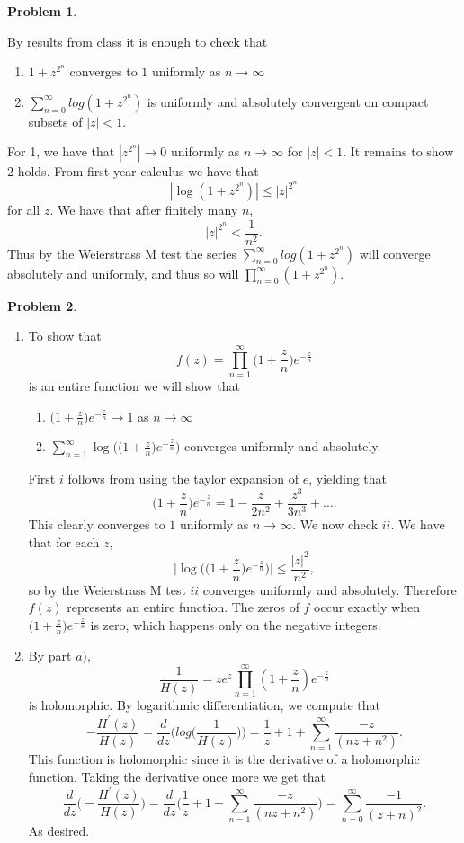 \documentclass[12pt, a4paper]{article}
\newtheorem{problem}{Problem}
\theoremstyle{definition}
\begin{document}
	\newpage
	\begin{problem}
	\end{problem}
 By results from class it is enough to check that \begin{enumerate}[label = \arabic*:]
 	\item $1+z^{2^n}$ converges to $1$ uniformly as $n\to \infty$ 
 	\item  $\sum_{n=0}^\infty log(1+z^{2^n})$ is uniformly and absolutely convergent on compact subsets of $|z|<1$.  
 	 \end{enumerate}
  For 1, we have that $|z^{2^n}| \to 0$ uniformly as $n\to \infty$ for $|z|<1$. It remains to show $2$ holds. From first year calculus we have that $$|\log(1+z^{2^n})| \leq |z|^{2^n}$$ for all $z$. We have that after finitely many $n$, $$|z|^{2^n} < \frac{1}{n^2}.$$
  Thus by the Weierstrass M test the series $\sum_{n=0}^\infty log(1+z^{2^n})$ will converge absolutely and uniformly, and thus so will $\prod_{n=0}^\infty (1+z^{2^n})$. 
  \newpage
  \begin{problem}
  \end{problem}
\begin{enumerate}[label = \alph*)]
	\item
To show that $$ f(z) = \prod_{n=1}^\infty \Big( 1+ \frac{z}{n}\Big)e^{-\frac{z}{n}}$$ is an 
entire function we will show that \begin{enumerate}[label = \roman*)]
	\item $\Big( 1+ \frac{z}{n}\Big)e^{-\frac{z}{n}} \to 1$ as $n\to \infty$
	\item $\sum_{n=1}^\infty \log \Big(\Big( 1+ \frac{z}{n}\Big)e^{-\frac{z}{n}} \Big)$ converges uniformly and absolutely. 
 \end{enumerate}
First $i$ follows from using the taylor expansion of $e$, yielding that $$\Big( 1+ \frac{z}{n}\Big)e^{-\frac{z}{n}} = 1 - \frac{z}{2n^2} + \frac{z^3}{3n^3} + \dots. $$
This clearly converges to $1$ uniformly as $n\to \infty$. We now check $ii$. We have that for each $z$, $$\Big| \log \Big(\Big( 1+ \frac{z}{n}\Big)e^{-\frac{z}{n}} \Big) \Big| \leq \frac{|z|^2}{n^2},$$ so by the Weierstrass M test $ii$ converges uniformly and absolutely. 
Therefore $f(z)$ represents an entire function. The zeros of $f$ occur exactly when $\Big( 1+ \frac{z}{n}\Big)e^{-\frac{z}{n}}$ is zero, which happens only on the negative integers. 
\item By part $a)$, $$\frac{1}{H(z)}=ze^z \prod_{n=1}^\infty (1+ \frac{z}{n})e^{-\frac{z}{n}}$$ is holomorphic. By logarithmic differentiation, we compute that $$ - \frac{H^\prime(z)}{H(z)} = \frac{d}{dz} \Big( log \Big(\frac{1}{H(z) } \Big) \Big) = \frac{1}{z} + 1 + \sum_{n=1}^\infty \frac{-z}{(nz+n^2)}.$$
This function is holomorphic since it is the derivative of a holomorphic function. Taking the derivative once more we get that $$\frac{d}{dz} \Big( - \frac{H^\prime(z)}{H(z)} \Big) = \frac{d}{dz} \Big( \frac{1}{z} + 1 +  \sum_{n=1}^\infty \frac{-z}{(nz+n^2)} \Big) = \sum_{n=0}^\infty \frac{-1}{(z+n)^2}. $$ As desired. 
 \end{enumerate}
\end{document}
